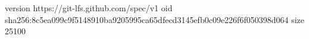 version https://git-lfs.github.com/spec/v1
oid sha256:8c5ea099c9f5148910ba9205995ca65dfecd3145efb0c09e226f6f050398d064
size 25100

